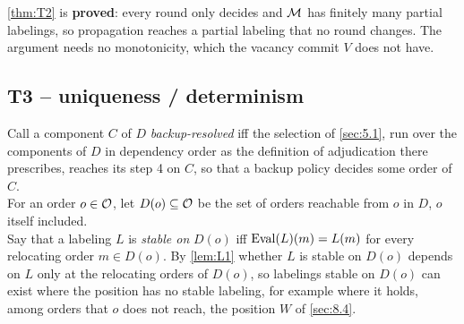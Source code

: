 \documentclass[12pt,a4paper]{article}
\begin{document}
\begin{status}
\cref{thm:T2} is \textbf{proved}: every round only decides and $\mathcal{M}$ has finitely many partial labelings, so propagation reaches a partial labeling that no round changes.
The argument needs no monotonicity, which the vacancy commit $V$ does not have.
\end{status}

\subsection{T3 -- uniqueness / determinism}\label{sec:8.3}

Call a component $C$ of $D$ \emph{backup-resolved} iff the selection of \cref{sec:5.1}, run over the components of $D$ in dependency order as the definition of adjudication there prescribes, reaches its step 4 on $C$, so that a backup policy decides some order of $C$.\\
For an order $o \in \mathcal{O}$, let $D(o) \subseteq \mathcal{O}$ be the set of orders reachable from $o$ in $D$, $o$ itself included.\\
Say that a labeling $L$ is \emph{stable on} $D(o)$ iff $\operatorname{Eval}(L)(m) = L(m)$ for every relocating order $m \in D(o)$.
By \cref{lem:L1} whether $L$ is stable on $D(o)$ depends on $L$ only at the relocating orders of $D(o)$, so labelings stable on $D(o)$ can exist where the position has no stable labeling, for example where it holds, among orders that $o$ does not reach, the position $W$ of \cref{sec:8.4}.
\end{document}
